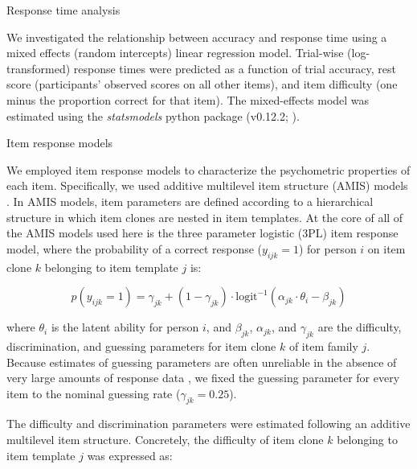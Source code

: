 \documentclass[a4paper,man,natbib]{apa6}
\makeatletter
\renewcommand{\subsubsection}{\@startsection{subsubsection}{3}
  {\z@}%
  {\b@level@two@skip}{\e@level@two@skip}%
  {\normalfont\normalsize\bfseries}}
\makeatother
\begin{document}
\subsubsection{Response time analysis}

We investigated the relationship between accuracy and response time using a mixed effects (random intercepts) linear regression model. Trial-wise (log-transformed) response times were predicted as a function of trial accuracy, rest score (participants' observed scores on all other items), and item difficulty (one minus the proportion correct for that item). The mixed-effects model was estimated using the \textit{statsmodels} python package (v0.12.2;  \citealt{seabold2010statsmodels}).

\subsubsection{Item response models}

We employed item response models to characterize the psychometric properties of each item. Specifically, we used additive multilevel item structure (AMIS) models \citep{geerlings2011modeling, cho2014additive, lathrop2017item}. In AMIS models, item parameters are defined according to a hierarchical structure in which item clones are nested in item templates. At the core of all of the AMIS models used here is the three parameter logistic (3PL) item response model, where the probability of a correct response ($y_{ijk} = 1$) for person $i$ on item clone $k$ belonging to item template $j$ is:

\begin{equation} \label{eq:1}
p(y_{ijk} = 1) = \gamma_{jk} + (1-\gamma_{jk}) \cdot \text{logit}^{-1} \left( \alpha_{jk} \cdot \theta_i - \beta_{jk} \right)
\end{equation}

\noindent where $\theta_i$ is the latent ability for person $i$, and $\beta_{jk}$, $\alpha_{jk}$, and $\gamma_{jk}$ are the difficulty, discrimination, and guessing parameters for item clone $k$ of item family $j$. Because estimates of guessing parameters are often unreliable in the absence of very large amounts of response data \citep{han2012fixing}, we fixed the guessing parameter for every item to the nominal guessing rate ($\gamma_{jk} = 0.25$).

The difficulty and discrimination parameters were estimated following an additive multilevel item structure. Concretely, the difficulty of item clone $k$ belonging to item template $j$ was expressed as:  
\end{document}

